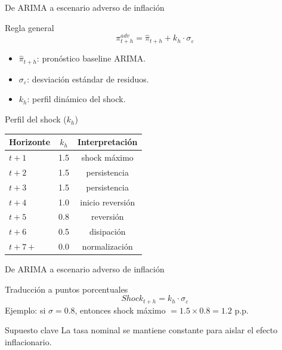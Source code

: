 \documentclass[10pt,aspectratio=169]{beamer}
\begin{document}
\begin{frame}{De ARIMA a escenario adverso de inflación}
\footnotesize
\begin{block}{Regla general}
\[
\pi^{adv}_{t+h} = \hat{\pi}_{t+h} + k_h \cdot \sigma_{\varepsilon}
\]
\end{block}

\begin{itemize}
\item $\hat{\pi}_{t+h}$: pronóstico baseline ARIMA.
\item $\sigma_{\varepsilon}$: desviación estándar de residuos.
\item $k_h$: perfil dinámico del shock.
\end{itemize}

\vspace{0.35cm}

\begin{block}{Perfil del shock ($k_h$)}
\begin{center}
\begin{tabular}{lcc}
\toprule
Horizonte & $k_h$ & Interpretación \\
\midrule
$t+1$ & 1.5 & shock máximo \\
$t+2$ & 1.5 & persistencia \\
$t+3$ & 1.5 & persistencia \\
$t+4$ & 1.0 & inicio reversión \\
$t+5$ & 0.8 & reversión \\
$t+6$ & 0.5 & disipación \\
$t+7+$ & 0.0 & normalización \\
\bottomrule
\end{tabular}
\end{center}
\end{block}
\end{frame}

\begin{frame}{De ARIMA a escenario adverso de inflación}
\begin{block}{Traducción a puntos porcentuales}
\[
Shock_{t+h} = k_h \cdot \sigma_{\varepsilon}
\]
\small
Ejemplo: si $\sigma = 0.8$, entonces shock máximo $= 1.5 \times 0.8 = 1.2$ p.p.
\end{block}

\vspace{0.3cm}

\begin{alertblock}{Supuesto clave}
La tasa nominal se mantiene constante para aislar el efecto inflacionario.
\end{alertblock}
\end{frame}
\end{document}
